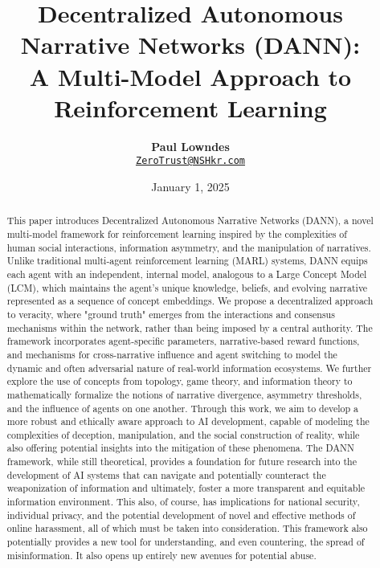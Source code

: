 \documentclass[12pt, a4paper]{article}
\title{\vspace{-2cm}\textbf{Decentralized Autonomous Narrative Networks (DANN): \\ A Multi-Model Approach to Reinforcement Learning}}
\author{\textbf{Paul Lowndes} \\ \href{mailto:ZeroTrust@NSHkr.com}{\texttt{ZeroTrust@NSHkr.com}}}
\date{\small January 1, 2025}
\begin{document}
\maketitle
\vspace{-1.5em}

\begin{abstract}
This paper introduces Decentralized Autonomous Narrative Networks (DANN), a novel multi-model framework for reinforcement learning inspired by the complexities of human social interactions, information asymmetry, and the manipulation of narratives. Unlike traditional multi-agent reinforcement learning (MARL) systems, DANN equips each agent with an independent, internal model, analogous to a Large Concept Model (LCM), which maintains the agent's unique knowledge, beliefs, and evolving narrative represented as a sequence of concept embeddings. We propose a decentralized approach to veracity, where "ground truth" emerges from the interactions and consensus mechanisms within the network, rather than being imposed by a central authority. The framework incorporates agent-specific parameters, narrative-based reward functions, and mechanisms for cross-narrative influence and agent switching to model the dynamic and often adversarial nature of real-world information ecosystems. We further explore the use of concepts from topology, game theory, and information theory to mathematically formalize the notions of narrative divergence, asymmetry thresholds, and the influence of agents on one another. Through this work, we aim to develop a more robust and ethically aware approach to AI development, capable of modeling the complexities of deception, manipulation, and the social construction of reality, while also offering potential insights into the mitigation of these phenomena. The DANN framework, while still theoretical, provides a foundation for future research into the development of AI systems that can navigate and potentially counteract the weaponization of information and ultimately, foster a more transparent and equitable information environment. This also, of course, has implications for national security, individual privacy, and the potential development of novel and effective methods of online harassment, all of which must be taken into consideration. This framework also potentially provides a new tool for understanding, and even countering, the spread of misinformation. It also opens up entirely new avenues for potential abuse.
\end{abstract}
\end{document}
